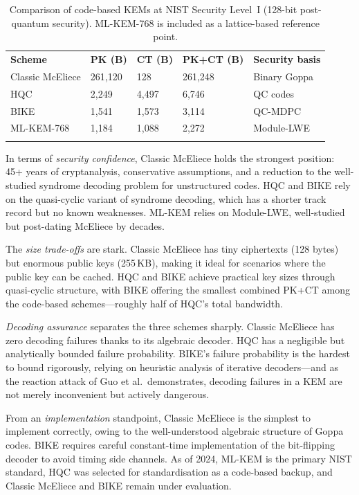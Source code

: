 \begin{table}[t]
\caption{Comparison of code-based KEMs at NIST Security Level~I (128-bit post-quantum security).  ML-KEM-768 is included as a lattice-based reference point.}
\label{tab:code-comparison}
\begin{tabular}{p{3cm}p{2cm}p{2cm}p{2cm}p{3cm}}
\hline\noalign{\smallskip}
\textbf{Scheme} & \textbf{PK (B)} & \textbf{CT (B)} & \textbf{PK+CT (B)} & \textbf{Security basis} \\
\noalign{\smallskip}\svhline\noalign{\smallskip}
Classic McEliece & 261,120 & 128    & 261,248 & Binary Goppa \\
HQC              & 2,249   & 4,497  & 6,746   & QC codes \\
BIKE             & 1,541   & 1,573  & 3,114   & QC-MDPC \\
ML-KEM-768       & 1,184   & 1,088  & 2,272   & Module-LWE \\
\noalign{\smallskip}\hline
\end{tabular}
\end{table}

In terms of \emph{security confidence}, Classic McEliece holds the strongest position: 45+ years of cryptanalysis, conservative assumptions, and a reduction to the well-studied syndrome decoding problem for unstructured codes.  HQC and BIKE rely on the quasi-cyclic variant of syndrome decoding, which has a shorter track record but no known weaknesses.  ML-KEM relies on Module-LWE, well-studied but post-dating McEliece by decades.

The \emph{size trade-offs} are stark.  Classic McEliece has tiny ciphertexts (128 bytes) but enormous public keys (255\,KB), making it ideal for scenarios where the public key can be cached.  HQC and BIKE achieve practical key sizes through quasi-cyclic structure, with BIKE offering the smallest combined PK+CT among the code-based schemes---roughly half of HQC's total bandwidth.

\emph{Decoding assurance} separates the three schemes sharply.  Classic McEliece has zero decoding failures thanks to its algebraic decoder.  HQC has a negligible but analytically bounded failure probability.  BIKE's failure probability is the hardest to bound rigorously, relying on heuristic analysis of iterative decoders---and as the reaction attack of Guo et al.\ demonstrates, decoding failures in a KEM are not merely inconvenient but actively dangerous.

From an \emph{implementation} standpoint, Classic McEliece is the simplest to implement correctly, owing to the well-understood algebraic structure of Goppa codes.  BIKE requires careful constant-time implementation of the bit-flipping decoder to avoid timing side channels.  As of 2024, ML-KEM is the primary NIST standard, HQC was selected for standardisation as a code-based backup, and Classic McEliece and BIKE remain under evaluation.

